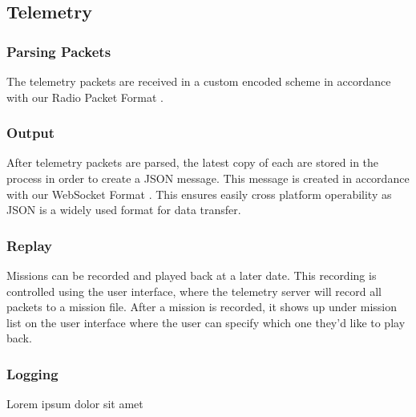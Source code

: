 \subsectionfont{\fontsize{14}{14}\selectfont}

\subsection{Telemetry}

\subsubsection{Parsing Packets}
The telemetry packets are received in a custom encoded scheme in accordance with our Radio Packet Format \cite{radio_packet_format}.

\subsubsection{Output}
After telemetry packets are parsed, the latest copy of each are stored in the process in order to create a JSON message. This message is created in accordance with our WebSocket Format \cite{websocket_format}. This ensures easily cross platform operability as JSON is a widely used format for data transfer.

\subsubsection{Replay}
Missions can be recorded and played back at a later date. This recording is controlled using the user interface, where the telemetry server will record all packets to a mission file. After a mission is recorded, it shows up under mission list on the user interface where the user can specify which one they'd like to play back.

\subsubsection{Logging}
Lorem ipsum dolor sit amet
